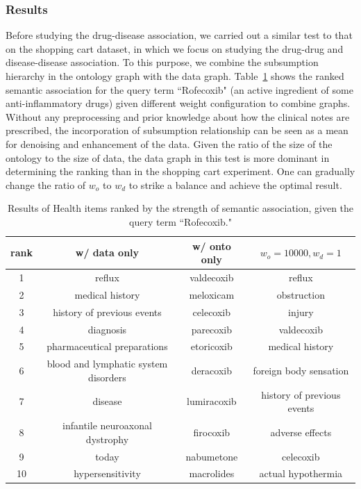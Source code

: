\subsubsection{Results}
Before studying the drug-disease association, we carried out a similar test to that on the shopping cart dataset, in which we focus on studying the drug-drug and disease-disease association. To this purpose, we combine the subsumption hierarchy in the ontology graph with the data graph. Table~\ref{tbl:health_comp} shows the ranked semantic association for the query term ``Rofecoxib" (an active ingredient of some anti-inflammatory drugs) given different weight configuration to combine graphs. Without any preprocessing and prior knowledge about how the clinical notes are prescribed, the incorporation of subsumption relationship can be seen as a mean for denoising and enhancement of the data. Given the ratio of the size of the ontology to the size of data, the data graph in this test is more dominant in determining the ranking than in the shopping cart experiment. One can gradually change the ratio of $w_o$ to $w_d$ to strike a balance and achieve the optimal result.
\begin{table}[tbh]\scriptsize
\begin{center}
\begin{tabular}{ c | c | c | c  }
\hline
rank    &   w/ data only	&	w/ onto only		&$w_o=10000, w_d=1$	 \\
\hline
1	&		reflux	&	valdecoxib	&		reflux	\\
2	&		medical history	&	meloxicam	&		obstruction	\\
3	&		history of previous events	&	celecoxib	&		injury	\\
4	&		diagnosis	&	parecoxib	&		valdecoxib	\\
5	&		pharmaceutical preparations	&	etoricoxib	&		medical history	\\
6	&		blood and lymphatic system disorders	&	deracoxib	&		foreign body sensation	\\
7	&		disease	&	lumiracoxib	&		history of previous events	\\
8	&		infantile neuroaxonal dystrophy	&	firocoxib	&		adverse effects	\\
9	&		today	&	nabumetone	&		celecoxib	\\
10	&		hypersensitivity	&	macrolides	&		actual hypothermia	\\
\hline
\end{tabular}
\end{center}
\caption[Top results on the electronic health dataset]{\label{tbl:health_comp}Results of Health items ranked by the strength of semantic association, given the query term ``Rofecoxib."}
\end{table}


